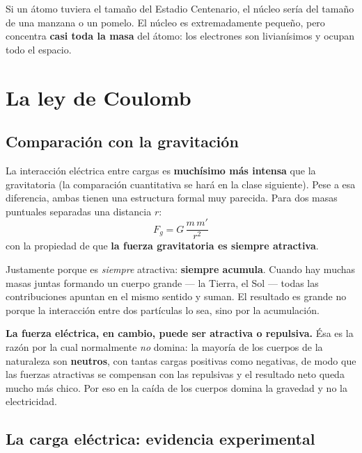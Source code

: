 \documentclass[12pt,a4paper]{article}
\begin{document}


\begin{notebox}
Si un átomo tuviera el tamaño del Estadio Centenario, el núcleo sería del tamaño
de una manzana o un pomelo. El núcleo es extremadamente pequeño, pero concentra
\textbf{casi toda la masa} del átomo: los electrones son livianísimos y ocupan
todo el espacio.
\end{notebox}

\section{La ley de Coulomb}

\subsection{Comparación con la gravitación}

La interacción eléctrica entre cargas es \textbf{muchísimo más intensa} que la
gravitatoria (la comparación cuantitativa se hará en la clase siguiente). Pese a
esa diferencia, ambas tienen una estructura formal muy parecida. Para dos masas
puntuales separadas una distancia $r$:
\[
F_g = G\,\frac{m\,m'}{r^2}
\]
con la propiedad de que \textbf{la fuerza gravitatoria es siempre atractiva}.

\begin{keybox}
Justamente porque es \emph{siempre} atractiva: \textbf{siempre acumula}. Cuando
hay muchas masas juntas formando un cuerpo grande --- la Tierra, el Sol --- todas
las contribuciones apuntan en el mismo sentido y suman. El resultado es grande no
porque la interacción entre dos partículas lo sea, sino por la acumulación.
\end{keybox}

\textbf{La fuerza eléctrica, en cambio, puede ser atractiva o repulsiva.} Ésa es
la razón por la cual normalmente \emph{no} domina: la mayoría de los cuerpos de la
naturaleza son \textbf{neutros}, con tantas cargas positivas como negativas, de
modo que las fuerzas atractivas se compensan con las repulsivas y el resultado
neto queda mucho más chico. Por eso en la caída de los cuerpos domina la gravedad
y no la electricidad.

\subsection{La carga eléctrica: evidencia experimental}
\end{document}
